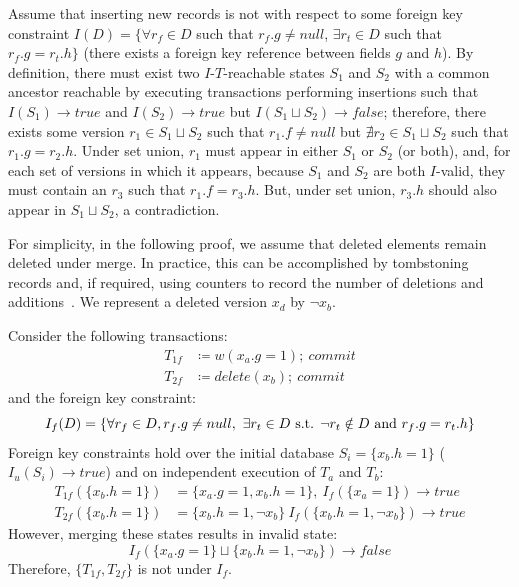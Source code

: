 \begin{claim}
\label{claim:fk-insert}
  Assume that inserting new records is not \iconfluent with respect to some foreign key constraint $I(D) = \{\forall r_f \in D$ such that $r_f.g \neq null$, $\exists r_t \in D$ such that $r_f.g = r_t.h\}$ (there exists a foreign key reference between fields $g$ and $h$). By definition, there must exist two $I$-$T$-reachable states $S_1$ and $S_2$ with a common ancestor reachable by executing transactions performing insertions such that $I(S_1) \rightarrow true$ and $I(S_2) \rightarrow true$ but $I(S_1 \sqcup S_2) \rightarrow false$; therefore, there exists some version $r_1 \in S_1 \sqcup S_2$ such that $r_1.f \neq null$ but $\nexists r_2 \in S_1 \sqcup S_2$ such that $r_1.g = r_2.h$. Under set union, $r_1$ must appear in either $S_1$ or $S_2$ (or both), and, for each set of versions in which it appears, because $S_1$ and $S_2$ are both $I$-valid, they must contain an $r_3$ such that $r_1.f = r_3.h$. But, under set union, $r_3.h$ should also appear in $S_1 \sqcup S_2$, a contradiction.
\end{claim}

For simplicity, in the following proof, we assume that deleted elements remain deleted under merge. In practice, this can be accomplished by tombstoning records and, if required, using counters to record the number of deletions and additions~\cite{crdt}. We represent a deleted version $x_d$ by $\neg x_b$.

\begin{claim}
\label{claim:fk-delete}
 Consider the following transactions:
\begin{align*}
T_{1f}&\coloneqq w(x_a.g=1);~commit\\
T_{2f}&\coloneqq delete(x_b);~commit
\end{align*}
and the foreign key constraint:
$$I_f(D) = \{\forall r_f \in D, r_f.g \neq null,~\exists r_t \in D \textrm{ s.t. } \neg r_t \notin D \textrm{ and } r_f.g = r_t.h\}$$
Foreign key constraints hold over the initial database $S_i=\{x_b.h=1\}$ ($I_u(S_i) \rightarrow true$) and on independent execution of $T_a$ and $T_b$:
\begin{align*}
T_{1f}(\{x_b.h=1\})&=\{x_a.g=1, x_b.h=1\},~I_f(\{x_a=1\}) \rightarrow true\\
T_{2f}(\{x_b.h=1\})&=\{x_b.h=1, \neg {x_b}\}~I_f(\{x_b.h=1, \neg {x_b}\}) \rightarrow true
\end{align*}
However, merging these states results in invalid state: 
$$I_f(\{x_a.g=1\}\sqcup \{x_b.h=1, \neg {x_b}\}) \rightarrow false$$
Therefore, $\{T_{1f}, T_{2f}\}$ is not \iconfluent under $I_f$.\end{claim}

